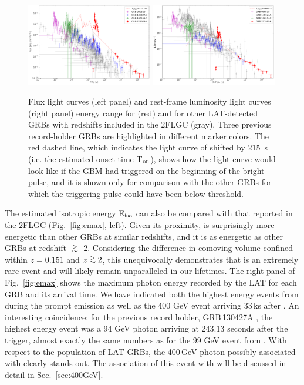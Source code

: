 \documentclass[preprint]{aastex631}
\begin{document}
\begin{figure}[t]
    \centering    
    \includegraphics[width=0.49\textwidth]{lcfit_tot_flux.pdf}
    \includegraphics[width=0.49\textwidth]{lcfit_tot_luminosity.pdf}
    \caption{Flux light curves (left panel) and rest-frame luminosity light curves (right panel)  energy range for \grb (red) and for other LAT-detected GRBs with redshifts included in the 2FLGC (gray). Three previous record-holder GRBs are highlighted in different marker colors. The red dashed line, which indicates the light curve of \grb shifted by 215~s (i.e. the estimated onset time T$_{\rm on}$), shows how the light curve would look like if the GBM had triggered on the beginning of the bright pulse, and it is shown only for comparison with the other GRBs for which the triggering pulse could have been below threshold. }
    \label{fig:fluence_luminosity}
\end{figure}

The estimated isotropic energy E$_{\rm iso}$ can also be compared with that reported in the 2FLGC (Fig.~\ref{fig:emax}, left). 
Given its proximity, \grb is surprisingly more energetic than other GRBs at similar redshifts, and it is as energetic as other GRBs at redshift $\gta$ 2. 
Considering the difference in comoving volume confined within $z=0.151$ and $z\gta 2$, this unequivocally demonstrates that \grb is an extremely rare event and will likely remain unparalleled in our lifetimes. 
The right panel of Fig.~\ref{fig:emax} shows the maximum photon energy recorded by the LAT for each GRB and its arrival time. We have indicated both the highest energy events from \grb during the prompt emission as well as the 400 GeV event arriving 33\,ks after \trig. 
 An interesting coincidence: for the previous record holder, GRB\,130427A , the highest energy event was a 94 GeV photon arriving at 243.13 seconds after the trigger, almost exactly the same numbers as for the 99 GeV event from \grb. With respect to the population of LAT GRBs, the 400\,GeV photon possibly associated with \grb clearly stands out. The association of this event with \grb will be discussed in detail in Sec.~\ref{sec:400GeV}.
\end{document}
